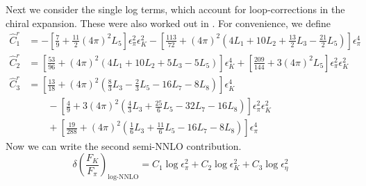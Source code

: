 \documentclass[prd,tightenlines,preprintnumbers,showpacs,superscriptaddress,notitlepage,eqsecnum,floatfix,notitlepage]{revtex4-1}
\begin{document}
Next we consider the single log terms, which account for loop-corrections in the chiral expansion. These were also worked out in \cite{Ananthanarayan:2017qmx}. For convenience, we define
\begin{align}
\hat C^r_1 
&= - \left[ \frac{7}{9} + \frac{11}{2} (4 \pi)^2 L_5 \right] \epsilon_\pi^2 \epsilon_K^2
- \left[ \frac{113}{72} + (4 \pi)^2 \left( 
4 L_1 + 10 L_2 + \frac{13}{2} L_3 - \frac{21}{2} L_5
\right) \right] \epsilon_\pi^4\\
\hat C^r_2 
&=   \left[ \frac{53}{96} + (4 \pi)^2 \left( 
4 L_1 + 10 L_2 + 5 L_3 - 5 L_5
\right) \right] \epsilon_K^4
+ \left[ \frac{209}{144} + 3 (4 \pi)^2 L_5 \right] \epsilon_\pi^2 \epsilon_K^2 \\
\hat C^r_3
&=   \left[ \frac{13}{18} + (4 \pi)^2 \left( 
\frac 83 L_3 - \frac 23 L_5 -16 L_7 - 8 L_8
\right) \right] \epsilon_K^4 \\
&\qquad 
- \left[ \frac{4}{9} + 3 (4 \pi)^2 \left(
\frac 43 L_3 + \frac {25}{6} L_5 -32 L_7 - 16 L_8
\right) \right] \epsilon_\pi^2 \epsilon_K^2 \nonumber \\
&\qquad 
+ \left[ \frac{19}{288} + (4 \pi)^2 \left( 
\frac 16 L_3 + \frac{11}{6} L_5 -16 L_7 - 8 L_8
\right) \right] \epsilon_\pi^4 \nonumber
\end{align}
Now we can write the second semi-NNLO contribution.
\begin{equation}
\delta\left(\frac{F_K}{F_\pi}\right)_\text{log-NNLO} =
C_1 \log \epsilon_\pi^2
+ C_2  \log \epsilon_K^2
+ C_3 \log \epsilon_\eta^2
\end{equation}
\end{document}
